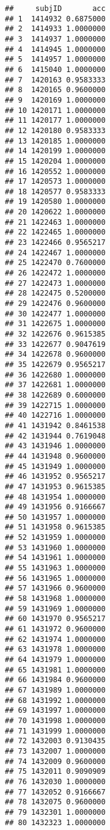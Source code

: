 \documentclass[
]{article}
\newenvironment{Shaded}{\begin{snugshade}}{\end{snugshade}}
\newcommand{\CommentTok}[1]{\textcolor[rgb]{0.56,0.35,0.01}{\textit{#1}}}
\newcommand{\DataTypeTok}[1]{\textcolor[rgb]{0.13,0.29,0.53}{#1}}
\newcommand{\DecValTok}[1]{\textcolor[rgb]{0.00,0.00,0.81}{#1}}
\newcommand{\KeywordTok}[1]{\textcolor[rgb]{0.13,0.29,0.53}{\textbf{#1}}}
\newcommand{\NormalTok}[1]{#1}
\newcommand{\OperatorTok}[1]{\textcolor[rgb]{0.81,0.36,0.00}{\textbf{#1}}}
\newcommand{\StringTok}[1]{\textcolor[rgb]{0.31,0.60,0.02}{#1}}
\begin{document}
\begin{Shaded}
\end{Shaded}

\begin{verbatim}
##     subjID       acc
## 1  1414932 0.6875000
## 2  1414933 1.0000000
## 3  1414937 1.0000000
## 4  1414945 1.0000000
## 5  1414957 1.0000000
## 6  1415040 1.0000000
## 7  1420163 0.9583333
## 8  1420165 0.9600000
## 9  1420169 1.0000000
## 10 1420171 1.0000000
## 11 1420177 1.0000000
## 12 1420180 0.9583333
## 13 1420185 1.0000000
## 14 1420199 1.0000000
## 15 1420204 1.0000000
## 16 1420552 1.0000000
## 17 1420573 1.0000000
## 18 1420577 0.9583333
## 19 1420580 1.0000000
## 20 1420622 1.0000000
## 21 1422463 1.0000000
## 22 1422465 1.0000000
## 23 1422466 0.9565217
## 24 1422467 1.0000000
## 25 1422470 0.7600000
## 26 1422472 1.0000000
## 27 1422473 1.0000000
## 28 1422475 0.5200000
## 29 1422476 0.9600000
## 30 1422477 1.0000000
## 31 1422675 1.0000000
## 32 1422676 0.9615385
## 33 1422677 0.9047619
## 34 1422678 0.9600000
## 35 1422679 0.9565217
## 36 1422680 1.0000000
## 37 1422681 1.0000000
## 38 1422689 0.6000000
## 39 1422715 1.0000000
## 40 1422716 1.0000000
## 41 1431942 0.8461538
## 42 1431944 0.7619048
## 43 1431946 1.0000000
## 44 1431948 0.9600000
## 45 1431949 1.0000000
## 46 1431952 0.9565217
## 47 1431953 0.9615385
## 48 1431954 1.0000000
## 49 1431956 0.9166667
## 50 1431957 1.0000000
## 51 1431958 0.9615385
## 52 1431959 1.0000000
## 53 1431960 1.0000000
## 54 1431961 1.0000000
## 55 1431963 1.0000000
## 56 1431965 1.0000000
## 57 1431966 0.9600000
## 58 1431968 1.0000000
## 59 1431969 1.0000000
## 60 1431970 0.9565217
## 61 1431972 0.9600000
## 62 1431974 1.0000000
## 63 1431978 1.0000000
## 64 1431979 1.0000000
## 65 1431981 1.0000000
## 66 1431984 0.9600000
## 67 1431989 1.0000000
## 68 1431992 1.0000000
## 69 1431997 1.0000000
## 70 1431998 1.0000000
## 71 1431999 1.0000000
## 72 1432003 0.9130435
## 73 1432007 1.0000000
## 74 1432009 0.9600000
## 75 1432011 0.9090909
## 76 1432030 1.0000000
## 77 1432052 0.9166667
## 78 1432075 0.9600000
## 79 1432301 1.0000000
## 80 1432323 1.0000000
\end{verbatim}
\end{document}
